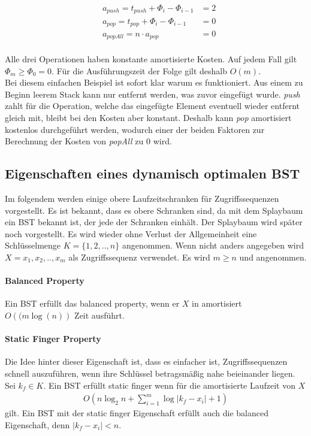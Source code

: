 \documentclass[a4paper,12pt]{article}
\begin{document}
\begin{align*}   
&a_{\mathit{push}} = t_{\mathit{push}} + \Phi_{i} - \Phi_{i-1}  &= 2\\
&a_{\mathit{pop}} = t_{\mathit{pop}} + \Phi_{i} - \Phi_{i-1}  &= 0\\
&a_{\mathit{popAll}} = n \cdot a_{\mathit{pop}} &= 0
\end{align*}\\
Alle drei Operationen haben konstante amortisierte Kosten. Auf jedem Fall gilt $ \Phi_m \geq  \Phi_0 = 0 $. Für die Ausführungszeit der Folge gilt deshalb $O(m)$. \\
Bei diesem einfachen Beispiel ist sofort klar warum es funktioniert. Aus einem zu Beginn leerem Stack kann nur entfernt werden, was zuvor eingefügt wurde. \textit{push} zahlt für die Operation, welche das eingefügte Element eventuell wieder entfernt gleich mit, bleibt bei den Kosten aber konstant. Deshalb kann \textit{pop} amortisiert kostenlos durchgeführt werden, wodurch einer der beiden Faktoren zur Berechnung der Kosten von \textit{popAll} zu $0$ wird. 



\subsection{Eigenschaften eines dynamisch optimalen BST }
Im folgendem werden einige obere Laufzeitschranken für Zugriffssequenzen vorgestellt. Es ist bekannt, dass es obere Schranken sind, da mit dem Splaybaum ein BST bekannt ist, der jede der Schranken einhält. Der Splaybaum wird später noch vorgestellt. Es wird wieder ohne Verlust der Allgemeinheit eine Schlüsselmenge $K = \{1,2,..,n\}$ angenommen. Wenn nicht anders angegeben wird  $X = x_1,x_2,..,x_m$ als Zugriffssequenz verwendet. Es wird $m \geq n$ und angenommen.


\paragraph{Balanced Property}
Ein BST erfüllt das balanced property, wenn er $X$ in amortisiert $O\left((m \log \left(n \right)\right)$ Zeit ausführt. 

\paragraph{Static Finger Property}
Die Idee hinter dieser Eigenschaft ist, dass es einfacher ist, Zugriffssequenzen schnell auszuführen, wenn ihre Schlüssel betragsmäßig nahe beieinander liegen. 
Sei $k_f \in K$. Ein BST erfüllt static finger wenn für die amortisierte Laufzeit von $X$ 
\begin{align*}
O\left(n \log_2 n + \sum_{i = 1}^{m} \log \vert k_f - x_i  \vert	+ 1	\right)
\end{align*}
gilt. Ein BST mit der static finger Eigenschaft erfüllt auch die balanced Eigenschaft, denn $ \vert k_f - x_i  \vert < n$.
\end{document}
